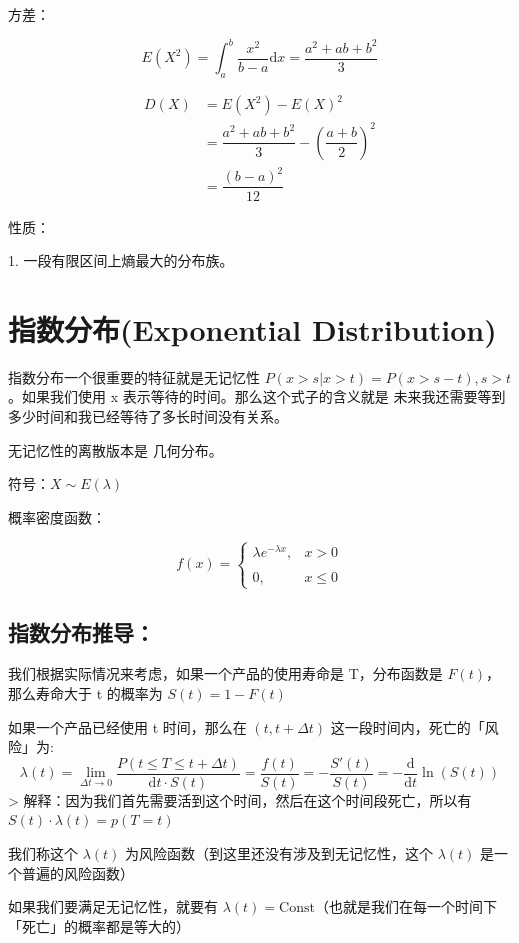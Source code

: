 \documentclass[12pt, a4paper, oneside]{ctexbook}
\begin{document}
 方差：

$$
E(X^{2}) = \int_{a}^{b} \dfrac{x^{2}}{b - a} \mathrm{d}x
= \dfrac{a^{2}+ab + b^{2}}{3}
$$

$$
\begin{aligned}
D(X) &= E(X^{2}) - E(X)^{2} \\
&= \dfrac{a^{2}+ab + b^{2}}{3} - \left( \dfrac{a+b}{2}\right)^{2} \\
&= \dfrac{(b - a)^{2}}{12}
\end{aligned}
$$

 性质：

1. 一段有限区间上熵最大的分布族。

\section{指数分布(Exponential Distribution)}

指数分布一个很重要的特征就是无记忆性 $P(x > s | x > t) = P(x > s - t), s > t$ 。如果我们使用 x 表示等待的时间。那么这个式子的含义就是 未来我还需要等到多少时间和我已经等待了多长时间没有关系。

无记忆性的离散版本是 几何分布。

 符号：$X\sim E(\lambda)$

 概率密度函数：

$$
f(x) = \begin{cases}
\lambda e^{-\lambda x}, &x > 0 \\
\\
0, &x \leq 0
\end{cases}
$$

\subsection{指数分布推导：}

我们根据实际情况来考虑，如果一个产品的使用寿命是 T，分布函数是 $F(t)$，那么寿命大于 t 的概率为 $S(t) = 1- F(t)$

如果一个产品已经使用 t 时间，那么在 $(t, t + \Delta t)$ 这一段时间内，死亡的「风险」为:
$$
\lambda(t) = \lim\limits_{\Delta t \to 0} \dfrac{P(t \leq T \leq t + \Delta t)}{\mathrm{d}t \cdot S(t)} = \dfrac{f(t)}{S(t)} = -\dfrac{S'(t)}{S(t)} = -\dfrac{\mathrm{d}}{\mathrm{d}t}\ln(S(t))
$$
> 解释：因为我们首先需要活到这个时间，然后在这个时间段死亡，所以有 $S(t) \cdot \lambda(t) = p(T = t)$

我们称这个 $\lambda(t)$ 为风险函数（到这里还没有涉及到无记忆性，这个 $\lambda(t)$ 是一个普遍的风险函数）

如果我们要满足无记忆性，就要有 $\lambda(t) = \text{Const}$（也就是我们在每一个时间下「死亡」的概率都是等大的）
\end{document}
